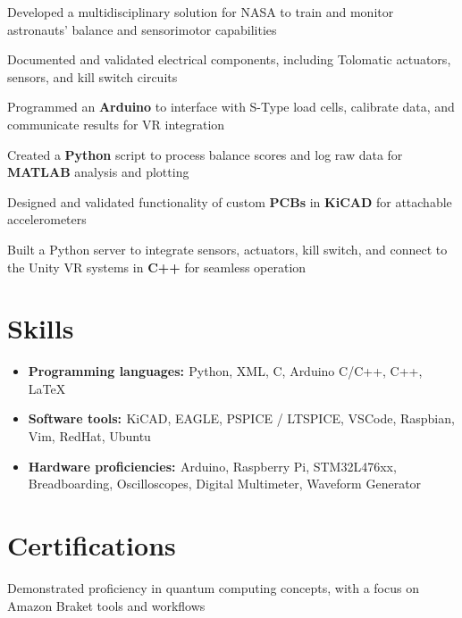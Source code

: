 \documentclass[a4paper]{comcv}
\begin{document}
\vspace{5 mm}
    \begin{tightlist}
        \item Developed a multidisciplinary solution for NASA to train and monitor astronauts' balance and sensorimotor capabilities
        \item Documented and validated electrical components, including Tolomatic actuators, sensors, and kill switch circuits
        \item Programmed an {\bf{Arduino}} to interface with S-Type load cells, calibrate data, and communicate results for VR integration
        \item Created a {\bf{Python}} script to process balance scores and log raw data for {\bf{MATLAB}} analysis and plotting
        \item Designed and validated functionality of custom {\bf{PCBs}} in {\bf{KiCAD}} for attachable accelerometers
        \item Built a Python server to integrate sensors, actuators, kill switch, and connect to the Unity VR systems in {\bf{C++}} for seamless operation

\end{tightlist}
\smallskip


\section{Skills}
\smallskip
\begin{itemize}
    \item {\bf{Programming languages: }}  {Python, XML, C, Arduino C/C++, C++, LaTeX} 
    \item {\bf{Software tools: }} {KiCAD, EAGLE, PSPICE / LTSPICE, VSCode, Raspbian, Vim, RedHat, Ubuntu}
    \item {\bf{Hardware proficiencies: }}  {Arduino, Raspberry Pi, STM32L476xx, Breadboarding, Oscilloscopes, Digital Multimeter, Waveform Generator} 
\end{itemize}
\smallskip

\section{Certifications}
\smallskip

\smallskip
\begin{tightlist}
    \item Demonstrated proficiency in quantum computing concepts, with a focus on Amazon Braket tools and workflows
\end{tightlist}
\end{document}
